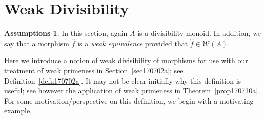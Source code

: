 \documentclass[reqno]{amsart}
\theoremstyle{plain}
\theoremstyle{definition}
\newtheorem*{assumptions}{Assumptions}
\newcommand{\cat}[1]{\mathcal{#1}}
\newcommand{\catw}{\cat{W}}
\numberwithin{equation}{lem}
\begin{document}
\section{Weak Divisibility}\label{sec170708a}

\begin{assumptions}
In this section, again  $A$ is a divisibility monoid.
In addition, we say that a morphism $\hat f$ is a \emph{weak equivalence} provided that $\hat f\in\catw(A)$.
\end{assumptions}

Here
we introduce a notion of 
weak divisibility
of morphisms for use with our treatment of 
weak primeness
in
Section~\ref{sec170702a}; see Definition~\ref{defn170702a}.
It may not be clear initially why this definition is useful; see however the application of 
weak
primeness in Theorem~\ref{prop170710a}.
For some motivation/perspective on this definition, 
we begin with a motivating example.
\end{document}
